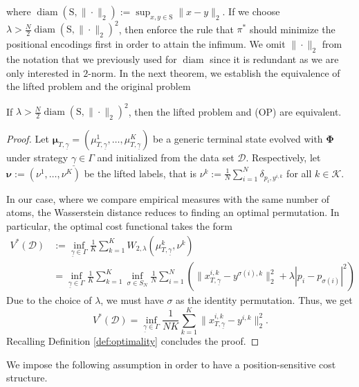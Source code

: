 \documentclass[11pt]{article}
\newcommand{\cD}{\mathcal{D}}
\newcommand{\cK}{\mathcal{K}}
\begin{document}
where $\operatorname{diam}(\mathrm{S}, \|\cdot\|_2) := \sup_{x,y\in\mathrm{S}}\|x-y\|_2$. If we choose $\lambda > \frac{N}{2}\operatorname{diam}(\mathrm{S}, \|\cdot\|_2)^2$, then enforce the rule that $\pi^*$ should minimize the positional encodings first in order to attain the infimum. We omit $\|\cdot\|_2$ from the notation that we previously used for $\operatorname{diam}$ since it is redundant as we are only interested in $2$-norm. In the next theorem, we establish the equivalence of the lifted problem and the original problem
\begin{theorem}
    If $\lambda > \frac{N}{2}\operatorname{diam}(\mathrm{S}, \|\cdot\|_2)^2$, then the lifted problem and (OP) are equivalent.
\end{theorem}
\begin{proof}
    Let $\bm{\mu}_{T,\underline{\gamma}} = (\mu_{T,\underline{\gamma}}^1,\ldots,\mu_{T,\underline{\gamma}}^K)$ be a generic terminal state evolved with $\bm{\Phi}$ under strategy $\underline{\gamma}\in\Gamma$ and initialized from the data set $\cD$. Respectively, let $\bm{\nu} := (\nu^1,\ldots,\nu^K)$ be the lifted labels, that is $\nu^k := \frac{1}{N}\sum_{i=1}^N\delta_{p_i, y^{i,k}}$ for all $k\in\cK$.

    In our case, where we compare empirical measures with the same number of atoms, the Wasserstein distance reduces to finding an optimal permutation. In particular, the optimal cost functional takes the form
    \begin{align*}
        V^*(\cD) &:= \inf_{\underline{\gamma}\in\Gamma}\frac{1}{K}\sum_{k=1}^K W_{2,\lambda}(\mu_{T,\underline{\gamma}}^k,\nu^k)\\
        &=\inf_{\underline{\gamma}\in\Gamma}\frac{1}{K}\sum_{k=1}^K \inf_{\sigma\in S_N}\frac{1}{N}\sum_{i=1}^N(\|x_{T,\underline{\gamma}}^{i,k} - y^{\sigma(i), k}\|_2^2 + \lambda|p_i - p_{\sigma(i)}|^2)
    \end{align*}
    Due to the choice of $\lambda$, we must have $\sigma$ as the identity permutation. Thus, we get
    \begin{equation*}
        V^*(\cD) = \inf_{\underline{\gamma}\in\Gamma}\frac{1}{NK}\sum_{k=1}^K \|x_{T,\underline{\gamma}}^{i,k} - y^{i, k}\|_2^2.
    \end{equation*}
    Recalling Definition \ref{def:optimality} concludes the proof.
\end{proof}

We impose the following assumption in order to have a position-sensitive cost structure.
\end{document}
